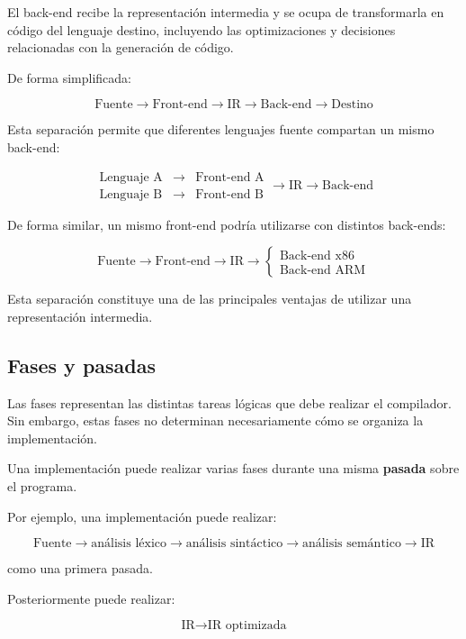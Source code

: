 \documentclass[11pt,a4paper]{article}
\begin{document}
El back-end recibe la representación intermedia y se ocupa de transformarla
en código del lenguaje destino, incluyendo las optimizaciones y decisiones
relacionadas con la generación de código.

De forma simplificada:

\[
\text{Fuente}
\rightarrow
\boxed{\text{Front-end}}
\rightarrow
\text{IR}
\rightarrow
\boxed{\text{Back-end}}
\rightarrow
\text{Destino}
\]

Esta separación permite que diferentes lenguajes fuente compartan un mismo
back-end:

\[
\begin{array}{ccc}
\text{Lenguaje A} & \rightarrow & \text{Front-end A} \\
\text{Lenguaje B} & \rightarrow & \text{Front-end B}
\end{array}
\rightarrow
\text{IR}
\rightarrow
\text{Back-end}
\]

De forma similar, un mismo front-end podría utilizarse con distintos
back-ends:

\[
\text{Fuente}
\rightarrow
\text{Front-end}
\rightarrow
\text{IR}
\rightarrow
\begin{cases}
\text{Back-end x86} \\
\text{Back-end ARM}
\end{cases}
\]

Esta separación constituye una de las principales ventajas de utilizar una
representación intermedia.

\subsection{Fases y pasadas}

Las fases representan las distintas tareas lógicas que debe realizar el
compilador. Sin embargo, estas fases no determinan necesariamente cómo se
organiza la implementación.

Una implementación puede realizar varias fases durante una misma
\textbf{pasada} sobre el programa.

Por ejemplo, una implementación puede realizar:

\[
\text{Fuente}
\rightarrow
\text{análisis léxico}
\rightarrow
\text{análisis sintáctico}
\rightarrow
\text{análisis semántico}
\rightarrow
\text{IR}
\]

como una primera pasada.

Posteriormente puede realizar:

\[
\text{IR}
\rightarrow
\text{IR optimizada}
\]
\end{document}
